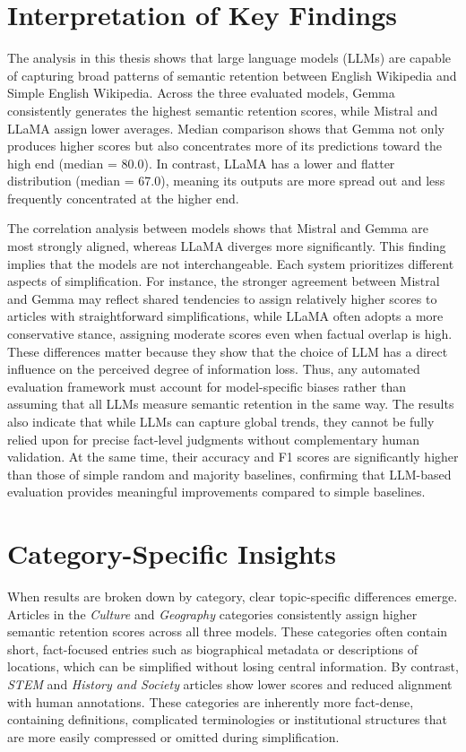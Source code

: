 \documentclass{DESSThesis}
\begin{document}
\section{Interpretation of Key Findings}
The analysis in this thesis shows that large language models (LLMs) are capable of capturing broad patterns of semantic retention between English Wikipedia and Simple English Wikipedia. Across the three evaluated models, Gemma consistently generates the highest semantic retention scores, while Mistral and LLaMA assign lower averages. Median comparison shows that Gemma not only produces higher scores but also concentrates more of its predictions toward the high end (median = 80.0). In contrast, LLaMA has a lower and flatter distribution (median = 67.0), meaning its outputs are more spread out and less frequently concentrated at the higher end.

The correlation analysis between models shows that Mistral and Gemma are most strongly aligned, whereas LLaMA diverges more significantly. This finding implies that the models are not interchangeable. Each system prioritizes different aspects of simplification. For instance, the stronger agreement between Mistral and Gemma may reflect shared tendencies to assign relatively higher scores to articles with straightforward simplifications, while LLaMA often adopts a more conservative stance, assigning moderate scores even when factual overlap is high. These differences matter because they show that the choice of LLM has a direct influence on the perceived degree of information loss. Thus, any automated evaluation framework must account for model-specific biases rather than assuming that all LLMs measure semantic retention in the same way. The results also indicate that while LLMs can capture global trends, they cannot be fully relied upon for precise fact-level judgments without complementary human validation. At the same time, their accuracy and F1 scores are significantly higher than those of simple random and majority baselines, confirming that LLM-based evaluation provides meaningful improvements compared to simple baselines.

\section{Category-Specific Insights}
When results are broken down by category, clear topic-specific differences emerge. Articles in the \textit{Culture} and \textit{Geography} categories consistently assign higher semantic retention scores across all three models. These categories often contain short, fact-focused entries such as biographical metadata or descriptions of locations, which can be simplified without losing central information. By contrast, \textit{STEM} and \textit{History and Society} articles show lower scores and reduced alignment with human annotations. These categories are inherently more fact-dense, containing definitions, complicated terminologies or institutional structures that are more easily compressed or omitted during simplification.
\end{document}
